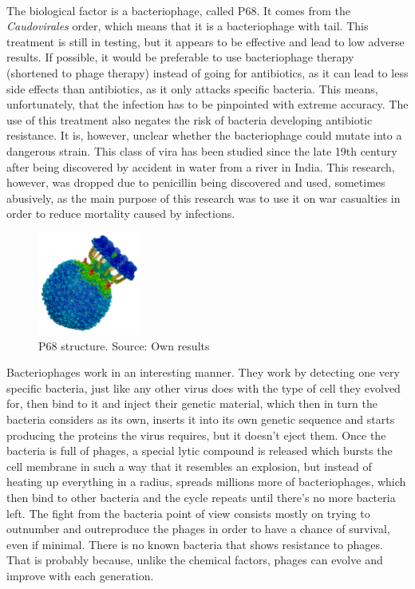 \paragraph{}The biological factor is a bacteriophage, called P68. It comes from the \emph{Caudovirales} order, which means that it is a bacteriophage with tail.  This treatment is still in testing, but it appears to be effective and lead to low adverse results. If possible, it would be preferable to use bacteriophage therapy (shortened to phage therapy) instead of going for antibiotics, as it can lead to less side effects than antibiotics, as it only attacks specific bacteria. This means, unfortunately, that the infection has to be pinpointed with extreme accuracy. The use of this treatment also negates the risk of bacteria developing antibiotic resistance. It is, however, unclear whether the bacteriophage could mutate into a dangerous strain. This class of vira has been studied since the late 19th century after being discovered by accident in water from a river in India. This research, however, was dropped due to penicillin being discovered and used, sometimes abusively, as the main purpose of this research was to use it on war casualties in order to reduce mortality caused by infections.
\newpage{}\begin{figure}\begin{center}\includegraphics[width=0.30\textwidth]{assets/staph_side.png}\end{center}\caption{P68 structure. Source: Own results}\end{figure}Bacteriophages work in an interesting manner. They work by detecting one very specific bacteria, just like any other virus does with the type of cell they evolved for, then bind to it and inject their genetic material, which then in turn the bacteria considers as its own, inserts it into its own genetic sequence and starts producing the proteins the virus requires, but it doesn't eject them. Once the bacteria is full of phages, a special lytic compound is released which bursts the cell membrane in such a way that it resembles an explosion, but instead of heating up everything in a radius, spreads millions more of bacteriophages, which then bind to other bacteria and the cycle repeats until there's no more bacteria left. The fight from the bacteria point of view consists mostly on trying to outnumber and outreproduce the phages in order to have a chance of survival, even if minimal. There is no known bacteria that shows resistance to phages. That is probably because, unlike the chemical factors, phages can evolve and improve with each generation.
